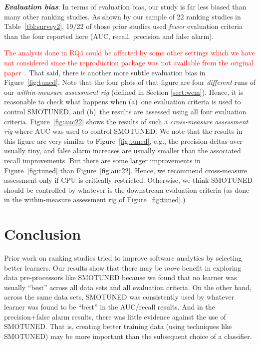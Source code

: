 \documentclass[sigconf,review, anonymous]{acmart}
\theoremstyle{break}
\theoremstyle{break}
\newcommand{\tion}[1]{{Section }\ref{sect:#1}}
\newcommand{\smb}{{\sc SMOTUNED}}
\begin{document}
\textbf{\textit{Evaluation bias}}: In terms of evaluation bias,
our study is far less biased than many other ranking studies.  As shown by our sample of
22 ranking studies in
Table~\ref{tbl:survey2}, 19/22 of those prior studies used {\em fewer} evaluation criteria
than the four reported here (AUC, recall, precision and false alarm). 

\textcolor{red}{The analysis done in RQ4 could be affected by some other settings which we have not considered since the reproduction package was not available from the original paper~\cite{bennin2017mahakil}.}
That said, there is another more subtle evaluation bias in  Figure~\ref{fig:tuned}. Note that the four plots of that figure are four {\em different} runs of our  {\em within-measure assessment rig}
(defined in \tion{wcm}). Hence, it is reasonable to check what happens when (a)~one
evaluation criteria is used to control {\smb}, and (b)~the results are assessed
using all four evaluation criteria. 
Figure~\ref{fig:auc22} shows the results of such a {\em cross-measure assessment rig} where AUC was used to control {\smb}. We note that the results in this figure are very similar to Figure~\ref{fig:tuned}, e.g., the precision deltas aver usually tiny, and false alarm increases are usually smaller than the associated recall improvements. But there are some larger improvements in Figure~\ref{fig:tuned}
than Figure~\ref{fig:auc22}. Hence, we recommend cross-measure assessment only if CPU is critically restricted. Otherwise, we think {\smb} should be controlled by whatever is the downstream evaluation criteria
(as done in the within-measure assessment rig of Figure~\ref{fig:tuned}.)



\section{Conclusion}
\label{sect:conclusion}





Prior work on ranking studies tried to improve software analytics by selecting better learners.
Our results show that there may be {\em more} benefit in exploring data pre-processors like {\smb} because we found  that no  learner  was  usually  
``best''  
across all  data  sets  and  all  evaluation  criteria. On the other hand, across the same data sets,
{\smb} was  consistently  used  by  whatever  learner  was  found  to  be ``best'' in the  AUC/recall results. And in the precision+false alarm results, there was little evidence against the use of {\smb}. That is, creating better training data  (using techniques like {\smb}) may be  more important than  the  subsequent  choice  of a classifier.
\end{document}
